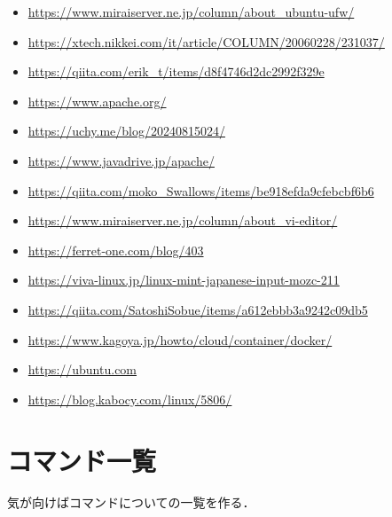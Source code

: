 \documentclass[dvipdfmx,a4paper,11pt]{jsbook}
\begin{document}
\begin{itemize}
  \item \url{https://www.miraiserver.ne.jp/column/about\_ubuntu-ufw/}
  \item \url{https://xtech.nikkei.com/it/article/COLUMN/20060228/231037/}
  \item \url{https://qiita.com/erik\_t/items/d8f4746d2dc2992f329e}
  \item \url{https://www.apache.org/}
  \item \url{https://uchy.me/blog/20240815024/}
  \item \url{https://www.javadrive.jp/apache/}
  \item \url{https://qiita.com/moko\_Swallows/items/be918efda9cfebcbf6b6}
  \item \url{https://www.miraiserver.ne.jp/column/about\_vi-editor/}
  \item \url{https://ferret-one.com/blog/403}
  \item \url{https://viva-linux.jp/linux-mint-japanese-input-mozc-211}
  \item \url{https://qiita.com/SatoshiSobue/items/a612ebbb3a9242c09db5}
  \item \url{https://www.kagoya.jp/howto/cloud/container/docker/}
  \item \url{https://ubuntu.com}
  \item \url{https://blog.kabocy.com/linux/5806/}
\end{itemize}


\appendix
\chapter{コマンド一覧}
気が向けばコマンドについての一覧を作る．
\end{document}
